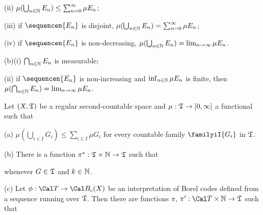 \quad(ii) $\mu(\bigcup_{n\in\Bbb N}E_n)\le\sum_{n=0}^{\infty}\mu E_n$;

\quad(iii) if $\sequencen{E_n}$ is disjoint,
$\mu(\bigcup_{n\in\Bbb N}E_n)=\sum_{n=0}^{\infty}\mu E_n$;

\quad(iv) if $\sequencen{E_n}$ is non-decreasing,
$\mu(\bigcup_{n\in\Bbb N}E_n)=\lim_{n\to\infty}\mu E_n$.

(b)(i) $\bigcap_{n\in\Bbb N}E_n$ is measurable;

\quad(ii) if $\sequencen{E_n}$ is non-increasing and
$\inf_{n\in\Bbb N}\mu E_n$ is finite, then
$\mu(\bigcap_{n\in\Bbb N}E_n)=\lim_{n\to\infty}\mu E_n$.


 Let $(X,\frak T)$
be a regular second-countable space and
$\mu:\frak T\to[0,\infty]$ a functional such that


(a) $\mu(\bigcup_{i\in I}G_i)\le\sum_{i\in I}\mu G_i$ for every countable
family $\familyiI{G_i}$ in $\frak T$.

(b) There is a function $\pi^*:\frak T\times\Bbb N\to\frak T$ such that


\noindent whenever $G\in\frak T$ and $k\in\Bbb N$.

(c) Let $\phi:\Cal T\to\Cal B_c(X)$ be an interpretation of Borel codes
defined from a sequence running over $\frak T$.   Then there are functions $\pi$,
$\pi':\Cal T\times\Bbb N\to\frak T$ such that

